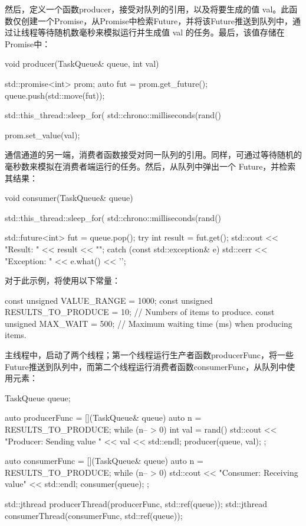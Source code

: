然后，定义一个函数producer，接受对队列的引用，以及将要生成的值 val。此函数仅创建一个Promise，从Promise中检索Future，并将该Future推送到队列中，通过让线程等待随机数毫秒来模拟运行并生成值 val 的任务。最后，该值存储在Promise中：

\begin{cpp}
void producer(TaskQueue& queue, int val) {
    std::promise<int> prom;
    auto fut = prom.get_future();
    queue.push(std::move(fut));

    std::this_thread::sleep_for(
            std::chrono::milliseconds(rand() %

    prom.set_value(val);
}
\end{cpp}

通信通道的另一端，消费者函数接受对同一队列的引用。同样，可通过等待随机的毫秒数来模拟在消费者端运行的任务。然后，从队列中弹出一个 Future，并检索其结果：

\begin{cpp}
void consumer(TaskQueue& queue) {
    std::this_thread::sleep_for(
            std::chrono::milliseconds(rand() %

    std::future<int> fut = queue.pop();
    try {
        int result = fut.get();
        std::cout << "Result: " << result << "\n";
    } catch (const std::exception& e) {
        std::cerr << "Exception: " << e.what() << '\n';
    }
}
\end{cpp}

对于此示例，将使用以下常量：

\begin{cpp}
const unsigned VALUE_RANGE = 1000;
const unsigned RESULTS_TO_PRODUCE = 10; // Numbers of items to produce.
const unsigned MAX_WAIT = 500; // Maximum waiting time (ms) when producing items.
\end{cpp}

主线程中，启动了两个线程；第一个线程运行生产者函数producerFunc，将一些Future推送到队列中，而第二个线程运行消费者函数consumerFunc，从队列中使用元素：

\begin{cpp}
TaskQueue queue;

auto producerFunc = [](TaskQueue& queue) {
    auto n = RESULTS_TO_PRODUCE;
    while (n-- > 0) {
        int val = rand() %
        std::cout << "Producer: Sending value " << val
                  << std::endl;
        producer(queue, val);
    }
};

auto consumerFunc = [](TaskQueue& queue) {
    auto n = RESULTS_TO_PRODUCE;
    while (n-- > 0) {
        std::cout << "Consumer: Receiving value"
                  << std::endl;
        consumer(queue);
    }
};

std::jthread producerThread(producerFunc, std::ref(queue));
std::jthread consumerThread(consumerFunc, std::ref(queue));
\end{cpp}

